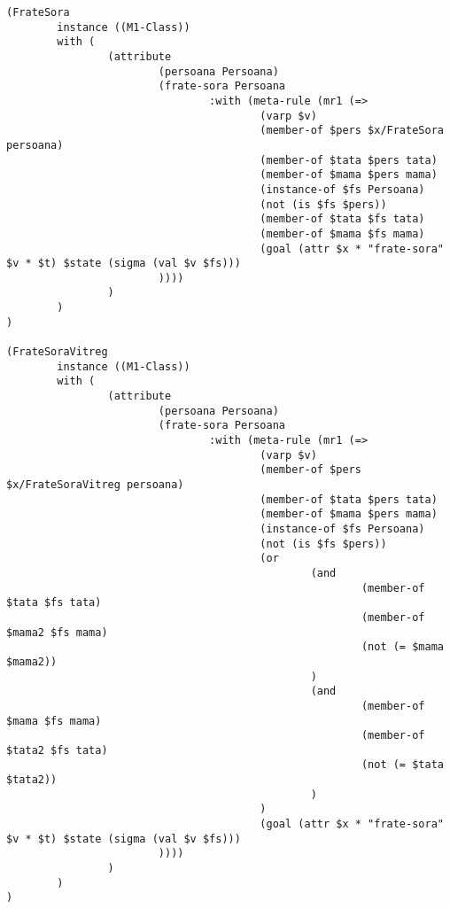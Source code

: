 \documentclass{article}
\begin{document}
{\begin{verbatim}
(FrateSora
        instance ((M1-Class))
        with (
                (attribute
                        (persoana Persoana)
                        (frate-sora Persoana
                                :with (meta-rule (mr1 (=>
                                        (varp $v)
                                        (member-of $pers $x/FrateSora persoana)
                                        (member-of $tata $pers tata)
                                        (member-of $mama $pers mama)
                                        (instance-of $fs Persoana)
                                        (not (is $fs $pers))
                                        (member-of $tata $fs tata)
                                        (member-of $mama $fs mama)
                                        (goal (attr $x * "frate-sora" $v * $t) $state (sigma (val $v $fs)))
                        ))))
                )
        )
)

(FrateSoraVitreg
        instance ((M1-Class))
        with (
                (attribute
                        (persoana Persoana)
                        (frate-sora Persoana
                                :with (meta-rule (mr1 (=>
                                        (varp $v)
                                        (member-of $pers $x/FrateSoraVitreg persoana)
                                        (member-of $tata $pers tata)
                                        (member-of $mama $pers mama)
                                        (instance-of $fs Persoana)
                                        (not (is $fs $pers))
                                        (or
                                                (and
                                                        (member-of $tata $fs tata)
                                                        (member-of $mama2 $fs mama)
                                                        (not (= $mama $mama2))
                                                )
                                                (and
                                                        (member-of $mama $fs mama)
                                                        (member-of $tata2 $fs tata)
                                                        (not (= $tata $tata2))
                                                )
                                        )
                                        (goal (attr $x * "frate-sora" $v * $t) $state (sigma (val $v $fs)))
                        ))))
                )
        )
)


\end{verbatim}}
\end{document}
